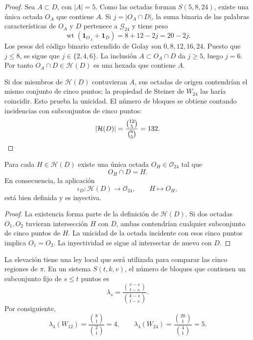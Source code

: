 \begin{proof}
Sea \(A\subset D\), con \(|A|=5\). Como las octadas forman
\(S(5,8,24)\), existe una única octada \(O_A\) que contiene \(A\). Si
\(j=|O_A\cap D|\), la suma binaria de las palabras características de
\(O_A\) y \(D\) pertenece a \(\mathcal G_{24}\) y tiene peso
\[
 \operatorname{wt}(\mathbf1_{O_A}+\mathbf1_D)=8+12-2j=20-2j.
\]
Los pesos del código binario extendido de Golay son
\(0,8,12,16,24\). Puesto que \(j\leq8\), se sigue que
\(j\in\{2,4,6\}\). La inclusión \(A\subset O_A\cap D\) da \(j\geq5\),
luego \(j=6\). Por tanto \(O_A\cap D\in\mathcal H(D)\) es una hexada que
contiene \(A\).

Si dos miembros de \(\mathcal H(D)\) contuvieran \(A\), sus octadas de
origen contendrían el mismo conjunto de cinco puntos; la propiedad de
Steiner de \(W_{24}\) las haría coincidir. Esto prueba la unicidad. El
número de bloques se obtiene contando incidencias con subconjuntos de cinco
puntos:
\[
 |\mathcal H(D)|
 =\frac{\binom{12}{5}}{\binom65}=132.\qedhere
\]
\end{proof}

\begin{theorem}
\label{p12-83-c17-s1:thm:elevacion-unica-hexada}
Para cada \(H\in\mathcal H(D)\) existe una única octada
\(O_H\in\mathcal O_{24}\) tal que
\[
 O_H\cap D=H.
\]
En consecuencia, la aplicación
\[
 \iota_D:\mathcal H(D)\longrightarrow\mathcal O_{24},
 \qquad H\longmapsto O_H,
\]
está bien definida y es inyectiva.
\end{theorem}

\begin{proof}
La existencia forma parte de la definición de \(\mathcal H(D)\). Si dos
octadas \(O_1,O_2\) tuvieran intersección \(H\) con \(D\), ambas
contendrían cualquier subconjunto de cinco puntos de \(H\). La unicidad de
la octada incidente con esos cinco puntos implica \(O_1=O_2\). La
inyectividad se sigue al intersectar de nuevo con \(D\).
\end{proof}

La elevación tiene una ley local que será utilizada para comparar las cinco
regiones de \(\pi\). En un sistema \(S(t,k,v)\), el número de bloques que
contienen un subconjunto fijo de \(s\leq t\) puntos es
\[
 \lambda_s=\frac{\binom{v-s}{t-s}}{\binom{k-s}{t-s}}.
\]
Por consiguiente,
\begin{equation}
 \lambda_4(W_{12})
 =\frac{\binom81}{\binom21}=4,
 \qquad
 \lambda_4(W_{24})
 =\frac{\binom{20}1}{\binom41}=5.
 \label{p12-83-c17-s1:eq:lambda4-w12-w24}
\end{equation}

